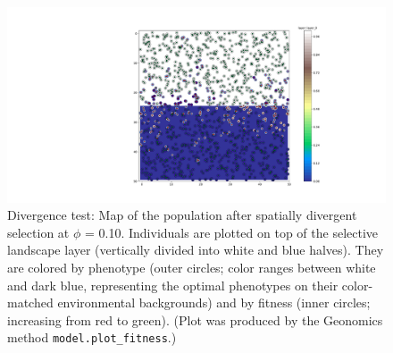 ﻿\documentclass{article}
\begin{document}
\begin{figure}[ht!]
        \includegraphics[width=175mm]{./img/final/DIVERGENCE_pop_plot.pdf}
        \caption{Divergence test: Map of the population after
                 spatially divergent selection at $\phi$ = 0.10.
                 Individuals are plotted on top of the selective landscape layer
                 (vertically divided into white and blue halves).
                 They are colored by phenotype (outer circles;
                 color ranges between white and dark blue,
                 representing the optimal phenotypes on
                 their color-matched environmental backgrounds)
                 and by fitness (inner circles; increasing from red to green).
                 (Plot was produced by the Geonomics method
                 \texttt{model.plot\_fitness}.)}
       \label{fig:div_pop}
\end{figure}
\end{document}
